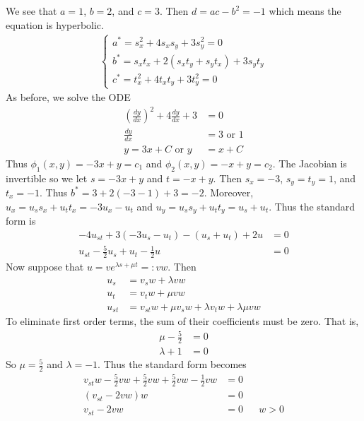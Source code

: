 \documentclass[12pt]{article}
\begin{document}
\begin{problem}[1.4.9a]
We see that $ a=1$, $b=2$, and  $ c=3$. Then $ d= ac -b^2 = -1$ which means the equation is hyperbolic. 
\begin{align*}
	\begin{cases}
		a^* = s_x^2 + 4 s_xs_y+3s_y^2 =0\\
		b^* = s_x t_x + 2(s_x t_y + s_y t_x) + 3 s_yt_y\\
		c^* = t_x^2 + 4 t_xt_y + 3 t_y^2 =0
	\end{cases}
\end{align*}
As before, we solve the ODE
\begin{align*}
	\left( \frac{d y}{d x}  \right)^2 + 4 \frac{d y}{d x} +3 &= 0 \\
	\frac{d y}{d x} &= 3 \text{ or }1  \\
	y = 3x+C \text{ or } y &= x+C  
\end{align*}
Thus $ \phi_1(x,y)= -3x+y = c_1$ and $ \phi_2(x,y) = -x+y= c_2$. The Jacobian is invertible so we let $ s = -3x+y$ and  $ t = -x+y$. Then  $ s_x = -3$,  $ s_y=t_y=1$, and $ t_x = -1$. Thus  $ b^* = 3+2(-3-1)+3= -2$. Moreover, $ u_x = u_s s_x + u_t t_x = -3u_x -u_t$ and  $ u_y = u_s s_y + u_t t_y = u_s + u_t$. Thus the standard form is
 \begin{align*}
	-4 u_{st} + 3(-3u_s - u_t) - (u_s+u_t) +2u &= 0 \\
	u_{st} - \frac{5}{2} u_s + u_t - \frac{1}{2} u &= 0 
\end{align*}
Now suppose that $ u = v e^{\lambda s + \mu t} =: v w$. Then
\begin{align*}
	u_s &= v_s w + \lambda vw  \\
	u_t &= v_t w + \mu vw \\
	u_{st} &= v_{st}w+ \mu v_s w + \lambda v_t w + \lambda \mu vw 
\end{align*}
To eliminate first order terms, the sum of their coefficients must be zero. That is,
\begin{align*}
	\mu -\frac{5}{2} &= 0 \\
	\lambda + 1 &= 0 
\end{align*}
So $ \mu = \frac{5}{2}$ and $ \lambda=-1$. Thus the standard form becomes
\begin{align*}
	v_{st}w -\frac{5}{2} vw + \frac{5}{2}vw + \frac{5}{2}vw- \frac{1}{2} vw &= 0 \\
	(v_{st}-2vw) w &= 0 \\
	v_{st} - 2vw &= 0 && w > 0
\end{align*}
\end{problem}
\end{document}
